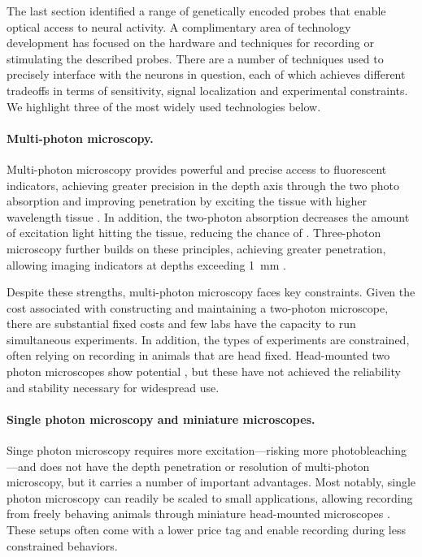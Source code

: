 The last section identified 
a range of genetically encoded probes that enable optical 
access to neural activity. A complimentary area of 
technology development has focused on the hardware and 
techniques for recording or stimulating the described 
probes. There are a number of techniques used to precisely 
interface with the neurons in question, each of which 
achieves different tradeoffs in terms of sensitivity, 
signal localization and experimental constraints. We 
highlight three of the most widely used technologies 
below.

\paragraph{Multi-photon microscopy.} Multi-photon microscopy
provides powerful and precise access to fluorescent indicators,
achieving greater precision in the depth axis through the 
two photo absorption and improving penetration by exciting the 
tissue with higher wavelength tissue \cite{Xu:1996ul}. In addition,
the two-photon absorption decreases the amount of excitation light 
hitting the tissue, reducing the chance of \cite{Denk:1990ws}.
Three-photon microscopy further builds on these principles, 
achieving greater penetration, allowing imaging indicators 
at depths exceeding 1~mm \cite{Horton:2013gxa,Wang:2017jp}.

Despite these strengths, multi-photon microscopy faces key 
constraints. Given the cost associated with constructing and 
maintaining a two-photon microscope, there are substantial fixed 
costs and few labs have the capacity to run simultaneous 
experiments. In addition, the types of experiments are constrained,
often relying on recording in animals that are head fixed. 
Head-mounted two photon microscopes show 
potential \cite{Helmchen:2001tw,Flusberg:2005tq}, but these 
have not achieved the reliability and stability necessary for 
widespread use.

\paragraph{Single photon microscopy and miniature microscopes.}
Singe photon microscopy requires more excitation---risking more
photobleaching---and does not have the depth penetration or 
resolution of multi-photon microscopy, but it carries a number 
of important advantages. Most notably, single photon microscopy 
can readily be scaled to small applications, allowing recording 
from freely behaving animals through miniature head-mounted 
microscopes \cite{Ghosh:2011ee,Cai:2016hm,LibertiIII:2017df}.
These setups often come with a lower price tag and enable 
recording during less constrained behaviors.


